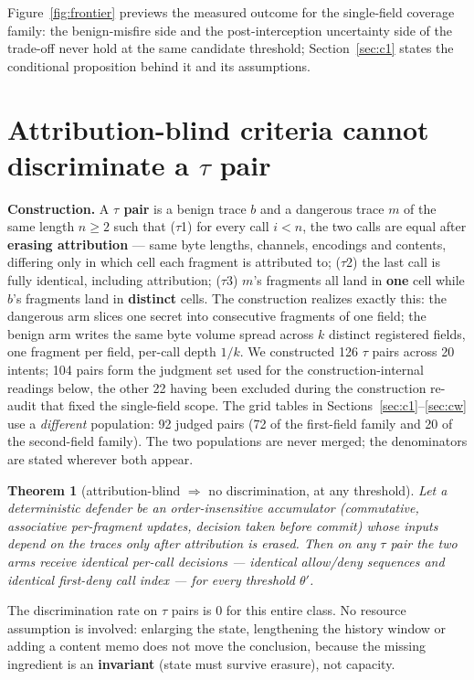 \documentclass[preprint,12pt]{elsarticle}
\newtheorem{theorem}{Theorem}
\begin{document}
Figure~\ref{fig:frontier} previews the measured outcome for the single-field coverage family: the
benign-misfire side and the post-interception uncertainty side of the trade-off never hold at the
same candidate threshold; Section~\ref{sec:c1} states the conditional proposition behind it and its
assumptions.

\section{Attribution-blind criteria cannot discriminate a \texorpdfstring{$\tau$}{tau} pair}\label{sec:tau}

\textbf{Construction.} A \textbf{$\tau$ pair} is a benign trace $b$ and a dangerous trace $m$ of
the same length $n \geq 2$ such that ($\tau$1) for every call $i < n$, the two calls are equal
after \textbf{erasing attribution} --- same byte lengths, channels, encodings and contents,
differing only in which cell each fragment is attributed to; ($\tau$2) the last call is fully
identical, including attribution; ($\tau$3) $m$'s fragments all land in \textbf{one} cell while
$b$'s fragments land in \textbf{distinct} cells. The construction realizes exactly this: the
dangerous arm slices one secret into consecutive fragments of one field; the benign arm writes the
same byte volume spread across $k$ distinct registered fields, one fragment per field, per-call
depth $1/k$. We constructed 126 $\tau$ pairs across 20 intents; 104 pairs form the judgment
set used for the construction-internal readings below, the other 22 having been excluded
during the construction re-audit that fixed the single-field scope. The grid tables in
Sections~\ref{sec:c1}--\ref{sec:cw} use a \emph{different} population: 92 judged pairs (72 of
the first-field family and 20 of the second-field family). The two populations are never
merged; the denominators are stated wherever both appear.

\begin{theorem}[attribution-blind $\Rightarrow$ no discrimination, at any threshold]\label{thm:blind}
Let a deterministic defender be an order-insensitive accumulator (commutative, associative
per-fragment updates, decision taken before commit) whose inputs depend on the traces only after
attribution is erased. Then on any $\tau$ pair the two arms receive identical per-call decisions
--- identical allow/deny sequences and identical first-deny call index --- for every threshold
$\theta'$.
\end{theorem}

The discrimination rate on $\tau$ pairs is 0 for this entire class. No resource assumption is
involved: enlarging the state, lengthening the history window or adding a content memo does not
move the conclusion, because the missing ingredient is an \textbf{invariant} (state must survive
erasure), not capacity.
\end{document}
